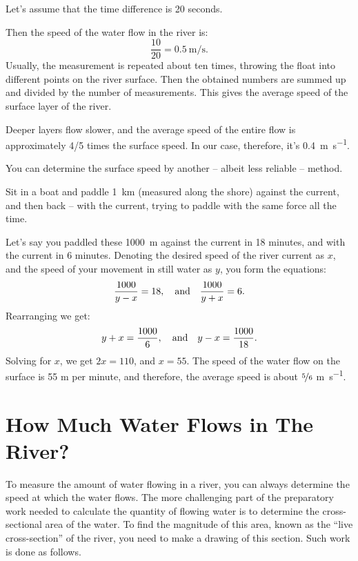 Let's assume that the time difference is 20 seconds.

Then the speed of the water flow in the river is:
\begin{equation*}%
\frac{10}{20} = \SI{0.5}{\meter\per\second}.
\end{equation*}
Usually, the measurement is repeated about ten times, throwing the float into different points on the river surface. Then the obtained numbers are summed up and divided by the number of measurements. This gives the average speed of the surface layer of the river.

Deeper layers flow slower, and the average speed of the entire flow is approximately 4/5 times the surface speed. In our case, therefore, it's \SI{0.4}{\meter\per\second}.

You can determine the surface speed by another -- albeit less reliable -- method.

Sit in a boat and paddle \SI{1}{\kilo\meter} (measured along the shore) against the current, and then back -- with the current, trying to paddle with the same force all the time.

Let's say you paddled these \SI{1000}{\meter} against the current in 18 minutes, and with the current in 6 minutes. Denoting the desired speed of the river current as $x$, and the speed of your movement in still water as $y$, you form the equations:
\begin{equation*}%
\frac{1000}{y - x} = 18, \qand \frac{1000}{y + x} = 6.
\end{equation*}
Rearranging we get:
\begin{equation*}%
y + x = \frac{1000}{6}, \qand y - x = \frac{1000}{18}.
\end{equation*}
Solving for $x$, we get $2x = 110$, and $x = 55$. The speed of the water flow on the surface is 55 m per minute, and therefore, the average speed is about $\nicefrac{5}{6}$ \si{\meter\per\second}.


\section{How Much Water Flows in The River?}
\label{sec-2.08}

To measure the amount of water flowing in a river, you can always determine the speed at which the water flows. The more challenging part of the preparatory work needed to calculate the quantity of flowing water is to determine the cross-sectional area of the water. To find the magnitude of this area, known as the ``live cross-section'' of the river, you need to make a drawing of this section. Such work is done as follows.

